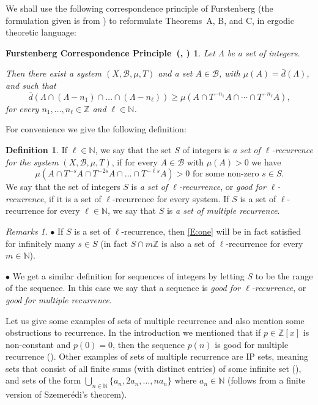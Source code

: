 \documentclass[11pt]{amsart}
\newcommand{\B}{\mathcal{B}}
\newcommand{\R}{\mathbb{R}}
\newcommand{\N}{\mathbb{N}}
\newcommand{\Z}{\mathbb{Z}}
\theoremstyle{plain}
\newtheorem*{Correspondence1}{Furstenberg Correspondence Principle~(\cite{Fu1}, \cite{Be1})}
\theoremstyle{definition}
\newtheorem{definition}[theorem]{Definition}
\theoremstyle{remark}
\newtheorem*{remarks}{Remarks}
\begin{document}
We shall use the following correspondence
principle of Furstenberg (the formulation given is from \cite{Be1}) to
reformulate Theorems~A, B, and C, in
ergodic theoretic language:
\begin{Correspondence1}\label{correspondence} Let $\Lambda$ be a
  set of integers.

  Then there exist a system $(X,\B,\mu,T)$ and a set
  $A\in\mathcal{B}$, with $\mu(A)=\bar{d}(\Lambda)$, and such that
  \begin{equation}\label{E:correspondence}
    \bar{d}(\Lambda \cap (\Lambda-n_1)\cap\ldots\cap
    (\Lambda-n_\ell))\geq \mu(A\cap T^{-n_1}A\cap\cdots \cap T^{-n_\ell}A),
  \end{equation}
  for every $n_1,\ldots,n_\ell\in\Z$ and $\ell\in\N$.
\end{Correspondence1}
 For convenience we give the following
definition:
\begin{definition}
  If $\ell\in\N$, we say that the set $S$ of integers is {\it a set of
    $\ell$-recurrence for the system $(X,\mathcal{B},\mu,T)$}, if for
  every $A\in \mathcal{B}$ with $\mu(A)>0$ we have
  \begin{equation}\label{E:one}
    \mu(A\cap T^{-s}A \cap T^{-2s}A\cap\dots \cap T^{-\ell s}A )>0
    \text{ for some non-zero } s\in S.
  \end{equation}
  We say that the set of integers $S$ is {\it a set of
    $\ell$-recurrence}, or {\it good for $\ell$-recurrence}, if it is
  a set of $\ell$-recurrence for every system. If $S$ is a set of
  $\ell$-recurrence for every $\ell\in\N$, we say that $S$ is \emph{a
    set of multiple recurrence}.
\end{definition}
\begin{remarks} $\bullet$ If $S$ is a set of
  $\ell$-recurrence, then \eqref{E:one} will be in fact satisfied for
  infinitely many $s\in S$ (in fact $S\cap m\Z$ is also a set of
  $\ell$-recurrence for every $m\in\N$).

  $\bullet$ We get a similar definition for sequences of integers by
  letting $S$ to be the range of the sequence. In this case we say that
  a sequence is \emph{good for $\ell$-recurrence}, or \emph{good for multiple recurrence}.
\end{remarks}
Let us give some examples of sets of multiple recurrence and also
mention some obstructions to recurrence. In the introduction we
mentioned that if $p\in \Z[x]$ is non-constant and $p(0)=0$, then the
sequence $p(n)$ is good for multiple recurrence (\cite{BL}).
Other examples of sets of multiple recurrence are IP sets,
meaning sets that consist of all finite sums (with distinct entries)
of some infinite set (\cite{FuK2}), and sets of the form
$\bigcup_{n\in\N}\{a_n,2a_n,\ldots,na_n\}$ where $a_n\in\N$ (follows
from a finite version of Szemer\'edi's theorem).
\end{document}
